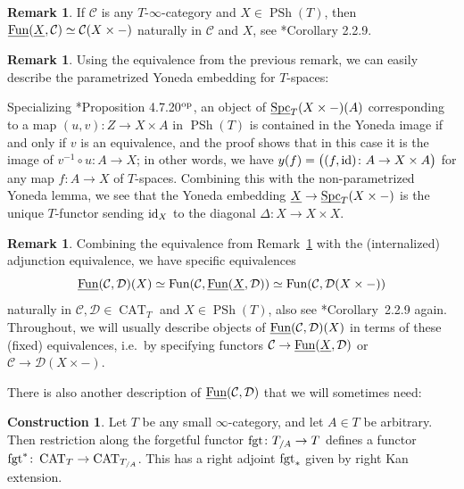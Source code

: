 \documentclass[reqno]{memo-l}
\theoremstyle{mythm}
\theoremstyle{definition}
\newtheorem{rk}[thm]{Remark}
\newtheorem{constr}[thm]{Construction}
\numberwithin{equation}{section}
\newcommand{\Cc}{{\mathcal{C}}}
\newcommand{\Dd}{{\mathcal{D}}}
\DeclareMathOperator{\Spc}{Spc}
\DeclareMathOperator{\CAT}{CAT}
\newcommand{\Fun}{{\textup{Fun}}}
\DeclareMathOperator{\PSh}{PSh}
\newcommand{\op}{{\textup{op}}}
\newcommand{\id}{\textup{id}}
\newcommand{\fgt}{\textup{fgt}}
\newcommand{\ulhelper}[2]{\underline{\setbox0=\hbox{$#1#2$}\dp0=0.4pt \box0\relax}}
\newcommand{\ul}[1]{{\mathpalette\ulhelper{#1}}\hbox{\rule[-2pt]{0pt}{0pt}}}
\begin{document}
\begin{rk}\label{rk:shift-vs-fun}
    If $\Cc$ is any $T$-$\infty$-category and $X\in\PSh(T)$, then $\ul\Fun(\ul X,\Cc)\simeq\Cc(X\times{-})$ naturally in $\Cc$ and $X$, see \cite{CLL_Global}*{Corollary 2.2.9}.
\end{rk} 

\begin{rk}\label{rk:Yoneda-image}
    Using the equivalence from the previous remark, we can easily describe the parametrized Yoneda embedding for $T$-spaces:

    Specializing \cite{martini2021yoneda}*{Proposition 4.7.20${}^\op$}, an object of $\ul\Spc_T(X\times{-})(A)$ corresponding to a map $(u,v)\colon Z\to X\times A$ in $\PSh(T)$ is contained in the Yoneda image if and only if $v$ is an equivalence, and the proof shows that in this case it is the image of $v^{-1}\circ u\colon A\to X$; in other words, we have $y(f)=\big((f,\id)\colon A\to X\times A\big)$ for any map $f\colon A\to X$ of $T$-spaces. Combining this with the non-parametrized Yoneda lemma, we see that the Yoneda embedding $\ul X\to\ul\Spc_T(X\times{-})$ is the unique $T$-functor sending $\id_X$ to the diagonal $\Delta\colon X\to X\times X$.
\end{rk}

\begin{rk}\label{rk:internal-hom-pw}
    Combining the equivalence from Remark~\ref{rk:shift-vs-fun} with the (internalized) adjunction equivalence, we have specific equivalences  
    \[
        \ul\Fun(\Cc,\Dd)(X)\simeq\Fun(\Cc,\ul\Fun(\ul X,\Dd))\simeq\Fun(\Cc,\Dd(X\times{-}))
    \]
    naturally in $\Cc,\Dd\in\CAT_T$ and $X\in\PSh(T)$, also see \cite{CLL_Global}*{Corollary~2.2.9} again. Throughout, we will usually describe objects of $\ul\Fun(\Cc,\Dd)(X)$ in terms of these (fixed) equivalences, i.e.~by specifying functors $\Cc\to\ul\Fun(\ul X,\Dd)$ or $\Cc\to\Dd(X\times{-})$.
\end{rk}

There is also another description of $\ul\Fun(\Cc,\Dd)$ that we will sometimes need:

\begin{constr}
    Let $T$ be any small $\infty$-category, and let $A\in T$ be arbitrary. Then restriction along the forgetful functor $\fgt\colon T_{/A}\to T$ defines a functor $\fgt^*\colon\CAT_T\to\CAT_{T_{/A}}$. This has a right adjoint $\fgt_*$ given by right Kan extension.
\end{constr}
\end{document}
